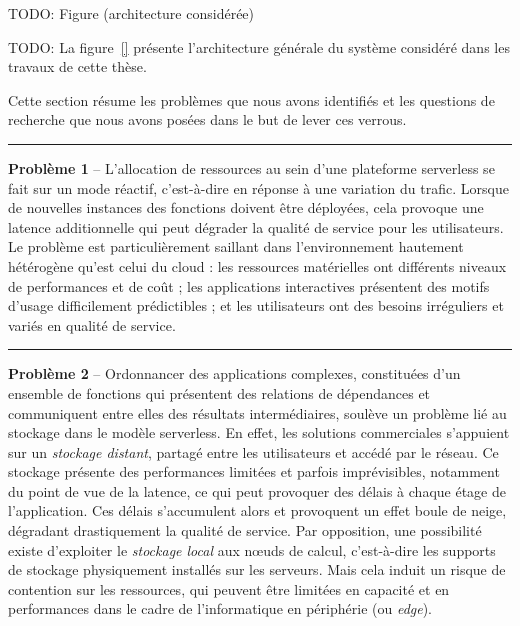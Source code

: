 TODO: Figure (architecture considérée)

TODO: La figure~\ref{} présente l'architecture générale du système considéré dans les travaux de cette thèse.

Cette section résume les problèmes que nous avons identifiés et les questions de recherche que nous avons posées dans le but de lever ces verrous.

\begin{center}
    \rule{4cm}{0.4pt}
\end{center}

\textbf{Problème 1} -- L'allocation de ressources au sein d'une plateforme serverless se fait sur un mode réactif, c'est-à-dire en réponse à une variation du trafic. Lorsque de nouvelles instances des fonctions doivent être déployées, cela provoque une latence additionnelle qui peut dégrader la qualité de service pour les utilisateurs. Le problème est particulièrement saillant dans l'environnement hautement hétérogène qu'est celui du cloud : les ressources matérielles ont différents niveaux de performances et de coût ; les applications interactives présentent des motifs d'usage difficilement prédictibles ; et les utilisateurs ont des besoins irréguliers et variés en qualité de service.


\begin{center}
    \rule{4cm}{0.4pt}
\end{center}

\textbf{Problème 2} -- Ordonnancer des applications complexes, constituées d'un ensemble de fonctions qui présentent des relations de dépendances et communiquent entre elles des résultats intermédiaires, soulève un problème lié au stockage dans le modèle serverless. En effet, les solutions commerciales s'appuient sur un \textit{stockage distant}, partagé entre les utilisateurs et accédé par le réseau. Ce stockage présente des performances limitées et parfois imprévisibles, notamment du point de vue de la latence, ce qui peut provoquer des délais à chaque étage de l'application. Ces délais s'accumulent alors et provoquent un effet boule de neige, dégradant drastiquement la qualité de service. Par opposition, une possibilité existe d'exploiter le \textit{stockage local} aux nœuds de calcul, c'est-à-dire les supports de stockage physiquement installés sur les serveurs. Mais cela induit un risque de contention sur les ressources, qui peuvent être limitées en capacité et en performances dans le cadre de l'informatique en périphérie (ou \textit{edge}).


